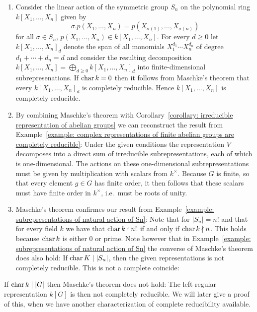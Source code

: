\begin{example}
  \leavevmode
  \begin{enumerate}
    \item
      Consider the linear action of the symmetric group $S_n$ on the polynomial ring $k[X_1, \dotsc, X_n]$ given by
      \[
          \sigma.p(X_1, \dotsc, X_n)
        = p(X_{\sigma(1)}, \dotsc, X_{\sigma(n)})
      \]
      for all $\sigma \in S_n$, $p(X_1, \dotsc, X_n) \in k[X_1, \dotsc, X_n]$.
      For every $d \geq 0$ let $k[X_1, \dotsc, X_n]_d$ denote the span of all monomials $X_1^{d_1} \dotsm X_n^{d_n}$ of degree $d_1 + \dotsb + d_n = d$ and consider the resulting decomposition $k[X_1, \dotsc, X_n] = \bigoplus_{d \geq 0} k[X_1, \dotsc, X_n]_d$ into finite-dimensional subrepresenations.
      If $\operatorname{char} k = 0$ then it follows from Maschke’s theorem that every $k[X_1, \dotsc, X_n]_d$ is completely reducible.
      Hence $k[X_1, \dotsc, X_n]$ is completely reducible.
    \item
      By combining Maschke’s theorem with Corollary~\ref{corollary: irreducible representation of abelian groups} we can reconstruct the result from Example~\ref{example: complex representations of finite abelian groups are completely reducible}:
      Under the given conditions the representation $V$ decomposes into a direct sum of irreducible subrepresentations, each of which is one-dimensional.
      The actions on these one-dimensional subrepresentations must be given by multiplication with scalars from $k^\times$.
      Because $G$ is finite, so that every element $g \in G$ has finite order, it then follows that these scalars must have finite order in $k^\times$, i.e.\ must be roots of unity.
      
    \item
      Maschke’s theorem confirmes our result from Example~\ref{example: subrepresentations of natural action of Sn}:
      Note that for $|S_n| = n!$ and that for every field $k$ we have that $\operatorname{char} k \nmid n!$ if and only if $\operatorname{char} k \nmid n$.
      This holds because $\operatorname{char} k$ is either $0$ or prime.
      Note however that in Example~\ref{example: subrepresentations of natural action of Sn} the converse of Maschke’s theorem does also hold:
      If $\operatorname{char} K \mid |S_n|$, then the given representations is not completely reducible.
      This is not a complete coincide:
  \end{enumerate}
\end{example}


\begin{warning}
  If $\operatorname{char} k \mid |G|$ then Maschke’s theorem does not hold:
  The left regular representation $k[G]$ is then not completely reducible.
  We will later give a proof of this, when we have another characterization of complete reducibility available.
\end{warning}


